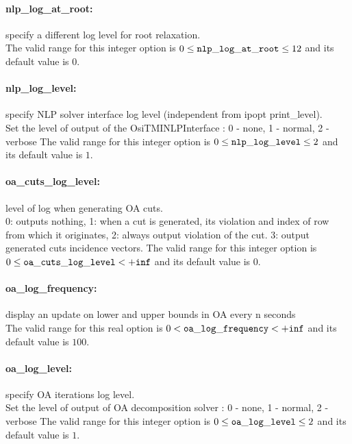 \paragraph{nlp\_log\_at\_root:}\label{opt:nlp_log_at_root} specify a different log level for root relaxation. \\
 The valid range for this integer option is
$0 \le {\tt nlp\_log\_at\_root } \le 12$
and its default value is $0$.


\paragraph{nlp\_log\_level:}\label{opt:nlp_log_level} specify NLP solver interface log level (independent from ipopt print\_level). \\
 Set the level of output of the OsiTMINLPInterface : 0 - none, 1 - normal, 2 - verbose The valid range for this integer option is
$0 \le {\tt nlp\_log\_level } \le 2$
and its default value is $1$.


\paragraph{oa\_cuts\_log\_level:}\label{opt:oa_cuts_log_level} level of log when generating OA cuts. \\
 0: outputs nothing,
1: when a cut is generated, its violation and index of row from which it originates,
2: always output violation of the cut.
3: output generated cuts incidence vectors. The valid range for this integer option is
$0 \le {\tt oa\_cuts\_log\_level } <  {\tt +inf}$
and its default value is $0$.


\paragraph{oa\_log\_frequency:}\label{opt:oa_log_frequency} display an update on lower and upper bounds in OA every n seconds \\
 The valid range for this real option is 
$0 <  {\tt oa\_log\_frequency } <  {\tt +inf}$
and its default value is $100$.


\paragraph{oa\_log\_level:}\label{opt:oa_log_level} specify OA iterations log level. \\
 Set the level of output of OA decomposition solver : 0 - none, 1 - normal, 2 - verbose The valid range for this integer option is
$0 \le {\tt oa\_log\_level } \le 2$
and its default value is $1$.


